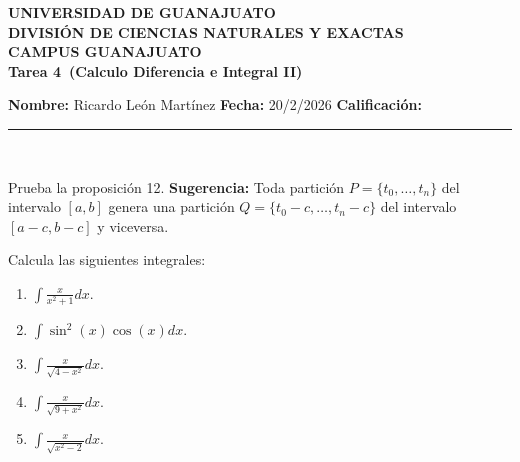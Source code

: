 \documentclass[12pt,a4paper]{article}
\newcommand{\alumno}{Ricardo León Martínez}
\newcommand{\materia}{Calculo Diferencia e Integral II}
\newcommand{\tarea}{Tarea 4}
\newcommand{\fecha}{20/2/2026}
\begin{document}
    \begin{center}
    {\large\textbf{UNIVERSIDAD DE GUANAJUATO}}\\[0.3cm]
    {\normalsize\textbf{DIVISIÓN DE CIENCIAS NATURALES Y EXACTAS}}\\
    {\normalsize\textbf{CAMPUS GUANAJUATO}}\\[1cm]

    {\Large\textbf{\tarea\ (\materia)}}\\[1cm]
    \end{center}

    \textbf{Nombre:} \alumno \hfill 
    \textbf{Fecha:} \fecha \hfill 
    \textbf{Calificación:} \rule{3cm}{0.4pt} \\[0.3cm]

    \begin{mdframed}[style=mdbluebox,frametitle={Ejercicio 1}]
        Prueba la proposición 12. \textbf{Sugerencia:} Toda partición $P=\{t_{0},\dots,t_{n}\}$ del intervalo $[a,b]$ genera una partición
        $Q=\{t_{0}-c,\dots,t_{n}-c\}$ del intervalo $[a-c,b-c]$ y viceversa.
    \end{mdframed}

    \begin{mdframed}[style=mdbluebox,frametitle={Ejercicio 2}]
        Calcula las siguientes integrales:
        \begin{enumerate}
            \item[(a)] $\displaystyle\int\frac{x}{x^{2}+1}dx$.
            \item[(b)] $\displaystyle\int\sin^{2}(x)\cos(x)dx$.
            \item[(c)] $\displaystyle\int\frac{x}{\sqrt{4-x^{2}}}dx$.
            \item[(d)] $\displaystyle\int\frac{x}{\sqrt{9+x^{2}}}dx$.
            \item[(e)] $\displaystyle\int\frac{x}{\sqrt{x^{2}-2}}dx$.    
        \end{enumerate}
    \end{mdframed}
\end{document}
